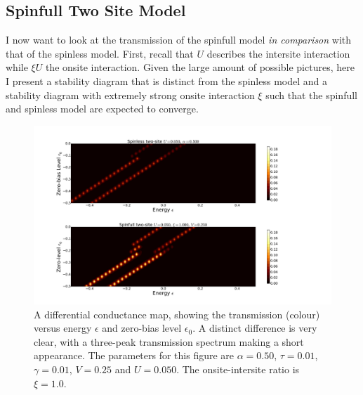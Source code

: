 \subsection{Spinfull Two Site Model}
I now want to look at the transmission of the spinfull model \emph{in comparison} with that of the spinless model. First, recall that $U$ describes the intersite interaction while $\xi U$ the onsite interaction. Given the large amount of possible pictures, here I present a stability diagram that is distinct from the spinless model and a stability diagram with extremely strong onsite interaction $\xi$ such that the spinfull and spinless model are expected to converge. 
  
\begin{figure}[htb]
    \centering
    \includegraphics[height=.38\textheight]{pdf/map/transmap_u1_k2.pdf}
    \caption{A differential conductance map, showing the transmission (colour) versus energy $\epsilon$ and zero-bias level $\epsilon_0$. A distinct difference is very clear, with a three-peak transmission spectrum making a short appearance. The parameters for this figure are $\alpha=0.50$, $\tau=0.01$, $\gamma=0.01$, $V=0.25$ and $U=0.050$. The onsite-intersite ratio is $\xi=1.0$.}
    \label{fig:transmap12}
\end{figure} 
